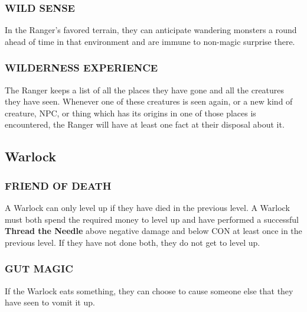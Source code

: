 \documentclass[twoside]{article}
\newcommand{\TTN}[2]{\textbf{Thread the Needle} above #1 and below #2}
\begin{document}
\subsubsection*{\footnotesize{W}\scriptsize{ILD} \footnotesize{S}\scriptsize{ENSE}\normalsize}

In the Ranger's favored terrain, they can anticipate wandering monsters a round ahead of time in that environment and are immune to non-magic surprise there.

\subsubsection*{\footnotesize{W}\scriptsize{ILDERNESS} \footnotesize{E}\scriptsize{XPERIENCE}\normalsize}

The Ranger keeps a list of all the places they have gone and all the creatures they have seen. Whenever one of these creatures is seen again, or a new kind of creature, NPC, or thing which has its origins in one of those places is encountered, the Ranger will have at least one fact at their disposal about it. 

\subsection*{Warlock}

\subsubsection*{\footnotesize{F}\scriptsize{RIEND OF} \footnotesize{D}\scriptsize{EATH}\normalsize}

A Warlock can only level up if they have died in the previous level. A Warlock must both spend the required money to level up and have performed a successful \TTN{negative damage}{CON} at least once in the previous level. If they have not done both, they do not get to level up.

\subsubsection*{\footnotesize{G}\scriptsize{UT} \footnotesize{M}\scriptsize{AGIC}\normalsize}

If the Warlock eats something, they can choose to cause someone else that they have seen to vomit it up.
\end{document}
